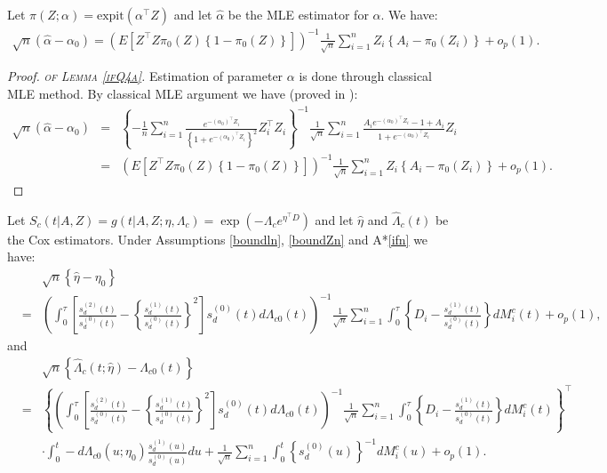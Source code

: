 \documentclass[11pt]{article}
\newcommand{\ee}{\end{eqnarray}}
\newcommand{\eqnn}{\begin{eqnarray*}}
\newcommand{\een}{\end{eqnarray*}}
\newcommand{\be}{\begin{eqnarray}}
\newcommand{\expit}{\text{expit}}
\begin{document}
\begin{lemmas}\label{ifQ4a}
Let $\pi(Z ; \alpha)=\expit{(\alpha^\top Z)}$ and 
let $\hat \alpha$ be the MLE estimator for $\alpha$.
We have:
\eqnn
\sqrt{n}(\hat \alpha-\alpha_0)=\left(E\left[Z^\top Z \pi_0(Z)\left\{1-\pi_0(Z)\right\}\right]\right)^{-1}\frac{1}{\sqrt{n}}\sum_{i=1}^n Z_i\left\{A_i-\pi_0(Z_i)\right\}+o_p(1).
\een
\end{lemmas}

\newenvironment{newproof13}{\begin{proof}\textsc{\emph{of Lemma \ref{ifQ4a}.}}}{\end{proof}}

\begin{newproof13}
Estimation of parameter $\alpha$ is done through classical MLE method. By classical MLE argument we have (proved in \cite{zeng2010adjustment}):
\eqnn
\sqrt{n}(\hat \alpha-\alpha_0)&=&\left\{-\frac{1}{n}\sum_{i=1}^n\frac{e^{-(\alpha_0)^\top Z_i}}{\left\{1+e^{-(\alpha_0)^\top Z_i}\right\}^2}Z_i^\top Z_i\right\}^{-1}\frac{1}{\sqrt{n}}\sum_{i=1}^n \frac{A_ie^{-(\alpha_0)^\top Z_i}-1+A_i}{1+e^{-(\alpha_0)^\top Z_i}}Z_i\\
&=&\left(E\left[Z^\top Z \pi_0(Z)\left\{1-\pi_0(Z)\right\}\right]\right)^{-1}\frac{1}{\sqrt{n}}\sum_{i=1}^n Z_i\left\{A_i-\pi_0(Z_i)\right\}+o_p(1).
\een
\end{newproof13}





\begin{lemmas}\label{ifQ4b}
Let $S_c(t | A,Z)=g(t | A,Z ; \eta, \Lambda_c)=\exp\left(-\Lambda_{c}e^{\eta^\top D}\right)$ and 
let $\hat \eta$ and $\hat \Lambda_{c}(t)$ be the Cox estimators.
Under Assumptions \ref{boundln}, \ref{boundZn} and  A*\ref{ifn} we have:
\eqnn
&&\sqrt{n}\left\{\hat\eta-\eta_0\right\}\\&=&\left(\int_0^\tau\left[\frac{s_d^{(2)}(t)}{s_d^{(0)}(t)}-\left\{\frac{s_d^{(1)}(t)}{s_d^{(0)}(t)}\right\}^2\right]s_d^{(0)}(t)d\Lambda_{c0}(t)\right)^{-1}\frac{1}{\sqrt{n}}\sum_{i=1}^n\int_0^\tau \left\{D_i-\frac{s_d^{(1)}(t)}{s_d^{(0)}(t)}\right\}dM^c_i(t)+o_p(1),\een
and
\be\label{3if}
&&
\sqrt{n}\left\{\hat\Lambda_{c}(t ; \hat \eta)-\Lambda_{c0}(t)\right\}\\
&=&\left\{\left(\int_0^\tau\left[\frac{s_d^{(2)}(t)}{s_d^{(0)}(t)}-\left\{\frac{s_d^{(1)}(t)}{s_d^{(0)}(t)}\right\}^2\right]s_d^{(0)}(t)d\Lambda_{c0}(t)\right)^{-1}\frac{1}{\sqrt{n}}\sum_{i=1}^n\int_0^\tau \left\{D_i-\frac{s_d^{(1)}(t)}{s_d^{(0)}(t)}\right\}dM^c_i(t)\right\}^\top\nonumber\\
&&\cdot\int_0^t  -d\Lambda_{c0}(u; \eta_0)\frac{s_d^{(1)}(u)}{s_d^{(0)}(u)}du +\frac{1}{\sqrt{n}}\sum_{i=1}^n\int_0^t \left\{s_d^{(0)}(u)\right\}^{-1}dM^c_i(u)+o_p(1).\nonumber
\ee\end{lemmas}
\end{document}
